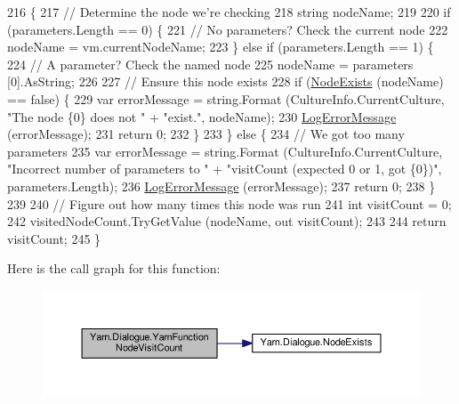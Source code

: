 \begin{DoxyCode}
216         \{
217             \textcolor{comment}{// Determine the node we're checking}
218             \textcolor{keywordtype}{string} nodeName;
219 
220             \textcolor{keywordflow}{if} (parameters.Length == 0) \{
221                 \textcolor{comment}{// No parameters? Check the current node}
222                 nodeName = vm.currentNodeName;
223             \} \textcolor{keywordflow}{else} \textcolor{keywordflow}{if} (parameters.Length == 1) \{
224                 \textcolor{comment}{// A parameter? Check the named node}
225                 nodeName = parameters [0].AsString;
226 
227                 \textcolor{comment}{// Ensure this node exists}
228                 \textcolor{keywordflow}{if} (\hyperlink{a00092_a93bb76a1f9a4058f225ff4cee97483c6}{NodeExists} (nodeName) == \textcolor{keyword}{false}) \{
229                     var errorMessage = string.Format (CultureInfo.CurrentCulture, \textcolor{stringliteral}{"The node \{0\} does not "} 
      + \textcolor{stringliteral}{"exist."}, nodeName);
230                     \hyperlink{a00092_a9801e83dd044d6498fdf6ebcc6bec5ac}{LogErrorMessage} (errorMessage);
231                     \textcolor{keywordflow}{return} 0;
232                 \}
233             \} \textcolor{keywordflow}{else} \{
234                 \textcolor{comment}{// We got too many parameters}
235                 var errorMessage = string.Format (CultureInfo.CurrentCulture, \textcolor{stringliteral}{"Incorrect number of
       parameters to "} + \textcolor{stringliteral}{"visitCount (expected 0 or 1, got \{0\})"}, parameters.Length);
236                 \hyperlink{a00092_a9801e83dd044d6498fdf6ebcc6bec5ac}{LogErrorMessage} (errorMessage);
237                 \textcolor{keywordflow}{return} 0;
238             \}
239 
240             \textcolor{comment}{// Figure out how many times this node was run}
241             \textcolor{keywordtype}{int} visitCount = 0;
242             visitedNodeCount.TryGetValue (nodeName, out visitCount);
243 
244             \textcolor{keywordflow}{return} visitCount;
245         \}
\end{DoxyCode}


Here is the call graph for this function\-:
\nopagebreak
\begin{figure}[H]
\begin{center}
\leavevmode
\includegraphics[width=350pt]{a00092_a10c9f22d3f55e74f091cd6069c431094_cgraph}
\end{center}
\end{figure}




